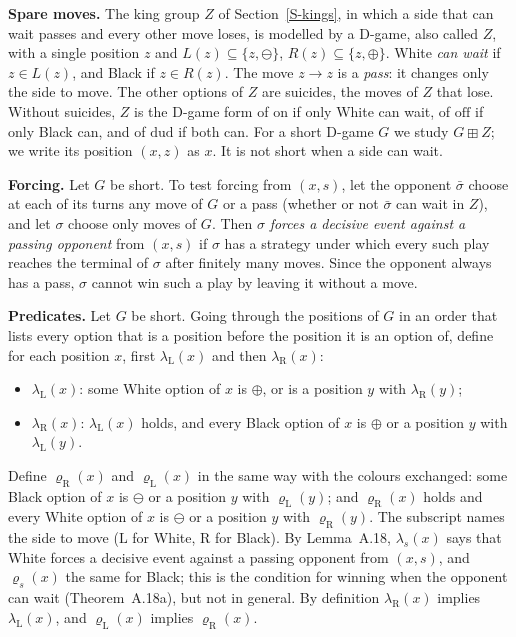 \textbf{Spare moves.} The king group $Z$ of Section~\ref{S-kings}, in which a side that can wait passes and every other
move loses, is modelled by a D-game, also called $Z$, with a single position $z$ and $L(z)\subseteq\{z,\ominus\}$,
$R(z)\subseteq\{z,\oplus\}$. White \emph{can wait} if $z\in L(z)$, and Black if $z\in R(z)$. The move $z\to z$ is a
\emph{pass}: it changes only the side to move. The other options of $Z$ are suicides, the moves of $Z$ that lose. Without
suicides, $Z$ is the D-game form of $\mathrm{on}$ if only White can wait, of $\mathrm{off}$ if only Black can, and of
$\mathrm{dud}$ if both can. For a short D-game $G$ we study $G\boxplus Z$; we write its position $(x,z)$ as $x$. It is not
short when a side can wait.

\textbf{Forcing.} Let $G$ be short. To test forcing from $(x,s)$, let the opponent $\bar\sigma$ choose at each of its
turns any move of $G$ or a pass (whether or not $\bar\sigma$ can wait in $Z$), and let $\sigma$ choose only moves of $G$.
Then $\sigma$ \emph{forces a decisive event against a passing opponent} from $(x,s)$ if $\sigma$ has a strategy under
which every such play reaches the terminal of $\sigma$ after finitely many moves. Since the opponent always has a pass,
$\sigma$ cannot win such a play by leaving it without a move.

\textbf{Predicates.} Let $G$ be short. Going through the positions of $G$ in an order that lists every option that is a
position before the position it is an option of, define for each position $x$,
first $\lambda_{\mathrm L}(x)$ and then $\lambda_{\mathrm R}(x)$:
\begin{itemize}
\item[] $\lambda_{\mathrm L}(x)$: some White option of $x$ is $\oplus$, or is a position $y$ with $\lambda_{\mathrm R}(y)$;
\item[] $\lambda_{\mathrm R}(x)$: $\lambda_{\mathrm L}(x)$ holds, and every Black option of $x$ is $\oplus$ or a
position $y$ with $\lambda_{\mathrm L}(y)$.
\end{itemize}
Define $\varrho_{\mathrm R}(x)$ and $\varrho_{\mathrm L}(x)$ in the same way with the colours exchanged: some Black option
of $x$ is $\ominus$ or a position $y$ with $\varrho_{\mathrm L}(y)$; and $\varrho_{\mathrm R}(x)$ holds and every White
option of $x$ is $\ominus$ or a position $y$ with $\varrho_{\mathrm R}(y)$. The subscript names the side to move
($\mathrm L$ for White, $\mathrm R$ for Black). By Lemma~A.18, $\lambda_s(x)$ says that White forces a decisive event
against a passing opponent from $(x,s)$, and $\varrho_s(x)$ the same for Black; this is the condition for winning when the
opponent can wait (Theorem~A.18a), but not in general. By definition $\lambda_{\mathrm R}(x)$ implies
$\lambda_{\mathrm L}(x)$, and $\varrho_{\mathrm L}(x)$ implies $\varrho_{\mathrm R}(x)$.

